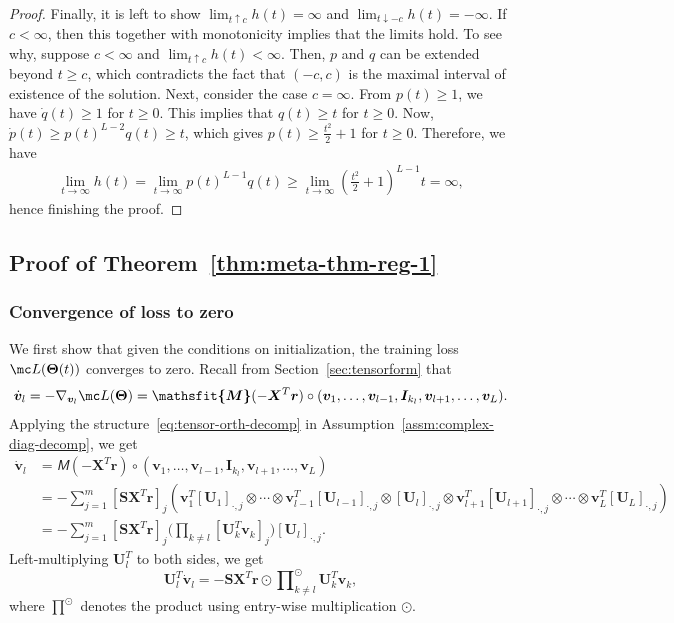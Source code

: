 \documentclass{article} %
\def\vr{{\bm{r}}}
\def\vv{{\bm{v}}}
\def\mI{{\bm{I}}}
\def\mS{{\bm{S}}}
\def\mU{{\bm{U}}}
\def\mX{{\bm{X}}}
\newcommand{\tens}[1]{\bm{\mathsfit{#1}}}
\def\tM{{\tens{M}}}
\newcommand{\bTheta}{\bm{\Theta}}
\begin{document}
\begin{proof}
Finally, it is left to show $\lim_{t \uparrow c} h(t) = \infty$ and $\lim_{t \downarrow -c} h(t)= -\infty$. If $c < \infty$, then this together with monotonicity implies that the limits hold. To see why, suppose $c<\infty$ and $\lim_{t \uparrow c} h(t) < \infty$. Then, $p$ and $q$ can be extended beyond $t\geq c$, which contradicts the fact that $(-c,c)$ is the maximal interval of existence of the solution. 
Next, consider the case $c = \infty$. From $p(t) \geq 1$, we have $\dot q(t) \geq 1$ for $t \geq 0$. This implies that $q(t) \geq t$ for $t \geq 0$. Now, $\dot p(t) \geq p(t)^{L-2} q(t) \geq t$, which gives $p(t) \geq \frac{t^2}{2}+1$ for $t \geq 0$. Therefore, we have 
\begin{align*}
\lim_{t \to \infty} h(t) = \lim_{t \to\infty} p(t)^{L-1}q(t) \geq \lim_{t \to \infty} \left ( \frac{t^2}{2}+1 \right )^{L-1} t = \infty,
\end{align*}
hence finishing the proof.
\end{proof}

\subsection{Proof of Theorem~\ref{thm:meta-thm-reg-1}}
\subsubsection{Convergence of loss to zero}
\label{sec:proof-meta-thm-reg-1-conv}
We first show that given the conditions on initialization, the training loss $\mc L(\bTheta(t))$ converges to zero. 
Recall from Section~\ref{sec:tensorform} that
\begin{align*}
    \dot \vv_l 
    = -\nabla_{\vv_l} \mc L(\bTheta)
    = \tM(-\mX^T \vr) \circ (\vv_1, \dots, \vv_{l-1}, \mI_{k_l}, \vv_{l+1}, \dots, \vv_L).
\end{align*}
Applying the structure~\eqref{eq:tensor-orth-decomp} in Assumption~\ref{assm:complex-diag-decomp}, we get
\begin{align*}
    \dot \vv_l 
    &= \tM(-\mX^T \vr) \circ (\vv_1, \dots, \vv_{l-1}, \mI_{k_l}, \vv_{l+1}, \dots, \vv_L)\\
    &= -\!\sum_{j=1}^m [\mS\mX^T\vr]_j (\vv_1^T[\mU_1]_{\cdot,j} \!\otimes \cdots \otimes \vv_{l-1}^T[\mU_{l-1}]_{\cdot,j} \!\otimes [\mU_l]_{\cdot, j} \!\otimes \vv_{l+1}^T[\mU_{l+1}]_{\cdot, j} \!\otimes \cdots \otimes \vv_{L}^T[\mU_{L}]_{\cdot, j})\\
    &= -\sum_{j=1}^m [\mS\mX^T\vr]_j \bigg(\prod_{k\neq l} [\mU_k^T \vv_k]_{j} \bigg) [\mU_l]_{\cdot, j}.
\end{align*}
Left-multiplying $\mU_l^T$ to both sides, we get
\begin{equation}
\label{eq:proof-reg-meta1-1}
    \mU_l^T \dot \vv_l = - \mS \mX^T \vr \odot \prod\nolimits_{k \neq l}^{\odot} \mU_k^T \vv_k,
\end{equation}
where $\prod^\odot$ denotes the product using entry-wise multiplication $\odot$.
\end{document}
